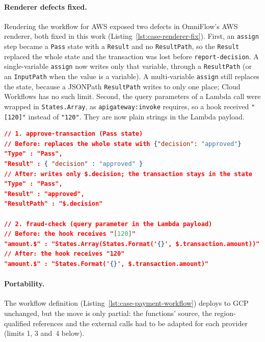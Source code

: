\paragraph{Renderer defects fixed.} Rendering the workflow for AWS exposed two defects in
OmniFlow's AWS renderer, both fixed in this work (Listing~\ref{lst:case-renderer-fix}). First, an
\texttt{assign} step became a \texttt{Pass} state with a \texttt{Result} and no
\texttt{ResultPath}, so the \texttt{Result} replaced the whole state and the transaction was lost
before \texttt{report-decision}. A single-variable \texttt{assign} now writes only that variable,
through a \texttt{ResultPath} (or an \texttt{InputPath} when the value is a variable). A
multi-variable \texttt{assign} still replaces the state, because a JSONPath \texttt{ResultPath}
writes to only one place; Cloud Workflows has no such limit. Second, the query parameters of a
Lambda call were wrapped in \texttt{States.Array}, as \texttt{apigateway:invoke} requires, so a hook
received \texttt{"[120]"} instead of \texttt{"120"}. They are now plain strings in the Lambda
payload.

\begin{lstlisting}[language=json,caption={The two AWS renderer defects, before and after the fix, in the rendered \texttt{PaymentAuthorization} state machine.},label={lst:case-renderer-fix},float=htbp,basicstyle=\ttfamily\fontsize{7.2}{8.6}\selectfont,breaklines=false]
// 1. approve-transaction (Pass state)
// Before: replaces the whole state with {"decision": "approved"}
"Type" : "Pass",
"Result" : { "decision" : "approved" }
// After: writes only $.decision; the transaction stays in the state
"Type" : "Pass",
"Result" : "approved",
"ResultPath" : "$.decision"

// 2. fraud-check (query parameter in the Lambda payload)
// Before: the hook receives "[120]"
"amount.$" : "States.Array(States.Format('{}', $.transaction.amount))"
// After: the hook receives "120"
"amount.$" : "States.Format('{}', $.transaction.amount)"
\end{lstlisting}

\paragraph{Portability.} The workflow definition (Listing~\ref{lst:case-payment-workflow})
deploys to GCP unchanged, but the move is only partial: the functions' source, the
region-qualified references and the external calls had to be adapted for each provider (limits 1,
3 and~4 below).

